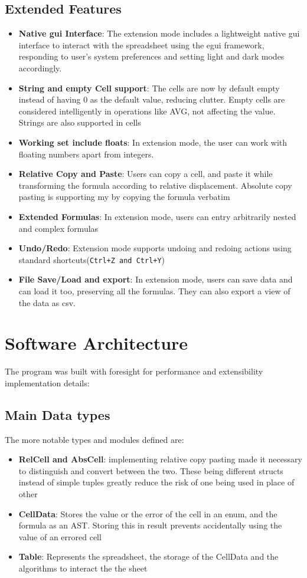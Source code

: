 \documentclass[12pt]{article}
\begin{document}
\subsection{Extended Features}
\begin{itemize}
\item \textbf{Native gui Interface}: The extension mode includes a lightweight native gui interface to interact with the
spreadsheet using the egui framework, responding to user's system preferences and setting light and dark modes accordingly.
\item \textbf{String and empty Cell support}: The cells are now by default empty instead of having 0 as the default value, reducing clutter. Empty cells are considered intelligently in operations like AVG, not affecting the value. Strings are also supported in cells
\item \textbf{Working set include floats}: In extension mode, the user can work with floating numbers apart from integers.
\item \textbf{Relative Copy and Paste}: Users can copy a cell, and paste it while transforming the formula according to relative displacement. Absolute copy pasting is supporting my by copying the formula verbatim
\item \textbf{Extended Formulas}: In extension mode, users can entry arbitrarily nested and complex formulas
\item \textbf{Undo/Redo}: Extension mode supports undoing and redoing actions using standard shortcuts(\texttt{Ctrl+Z and Ctrl+Y})
\item \textbf{File Save/Load and export}: In extension mode, users can save data and can load it too, preserving all the formulas. They can also export a view of the data as csv.
\end{itemize}

\section{Software Architecture}
The program was built with foresight for performance and extensibility
implementation details:

\subsection{Main Data types}
The more notable types and modules defined are:
\begin{itemize}
\item \textbf{RelCell and AbsCell}: implementing relative copy pasting made it necessary to distinguish and convert between the two. These being different structs instead of simple tuples greatly reduce the risk of one being used in place of other
\item \textbf{CellData}: Stores the value or the error of the cell in an enum, and the formula as an AST. Storing this in result prevents accidentally using the value of an errored cell
\item \textbf{Table}: Represents the spreadsheet, the storage of the CellData and the algorithms to interact the the sheet
\end{itemize}
\end{document}
